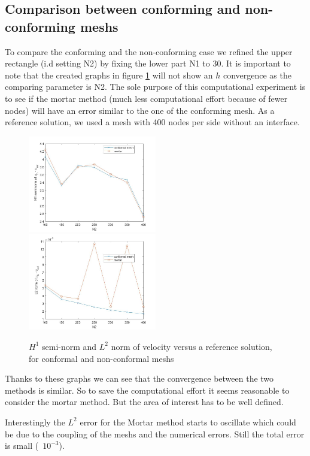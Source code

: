 \documentclass{article}
\begin{document}
\subsection*{Comparison between conforming and non-conforming meshs}
To compare the conforming and the non-conforming case we refined the upper rectangle (i.d setting N2) by fixing the lower part N1 to 30. It is important to note that the created graphs in figure \ref{comp_meshs} will not show an $h$ convergence as the comparing parameter is N2. The sole purpose of this computational experiment is to see if the mortar method (much less computational effort because of fewer nodes) will have an error similar to the one of the conforming mesh. As a reference solution, we used a mesh with 400 nodes per side without an interface.

\begin{figure}[H]
	\includegraphics[width=0.5\textwidth]{imgs/errorH1.jpg}
	\includegraphics[width=0.5\textwidth]{imgs/errorL2.jpg}
	\caption{$H^1$ semi-norm and $L^2$ norm of velocity versus a reference solution, for conformal and non-conformal meshs}
	\label{comp_meshs}
\end{figure}

Thanks to these graphs we can see that the convergence between the two methods is similar. So to save the computational effort it seems reasonable to consider the mortar method. But the area of interest has to be well defined.

Interestingly the $L^2$ error for the Mortar method starts to oscillate which could be due to the coupling of the meshs and the numerical errors. Still the total error is small (~$10^{-3}$).
\end{document}
